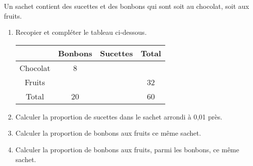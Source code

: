
Un sachet contient des sucettes et des bonbons qui sont soit au chocolat, soit aux fruits.
\begin{enumerate}
\item Recopier et compléter le tableau ci-dessous.

\begin{tabular}{|c|c|c|c|}
\hline 
  & Bonbons & Sucettes & Total \\ 
\hline 
Chocolat & 8 &   &   \\ 
\hline 
Fruits &   &   & 32 \\ 
\hline 
Total & 20 &   & 60 \\ 
\hline 
\end{tabular} 

\item Calculer la proportion de sucettes dans le sachet arrondi à 0,01 près.
\item Calculer la proportion de bonbons aux fruits ce même sachet.
\item Calculer la proportion de bonbons aux fruits, parmi les bonbons, ce même sachet.
\end{enumerate}
 